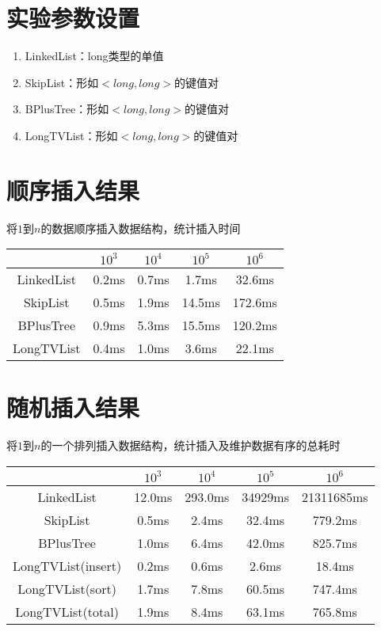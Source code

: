 \documentclass[UTF8]{article}
\begin{document}
\section{实验参数设置}
\begin{enumerate}
    \item LinkedList：long类型的单值
    \item SkipList：形如$<long, long>$的键值对
    \item BPlusTree：形如$<long, long>$的键值对
    \item LongTVList：形如$<long, long>$的键值对
\end{enumerate}

\section{顺序插入结果}
将$1$到$n$的数据顺序插入数据结构，统计插入时间

\begin{tabular}{|c|c|c|c|c|}

    \hline
     & $10^3$ & $10^4$ & $10^5$ & $10^6$ \\
    \hline
    LinkedList & 0.2ms & 0.7ms & 1.7ms & 32.6ms\\
    \hline
    SkipList & 0.5ms & 1.9ms & 14.5ms & 172.6ms\\
    \hline
    BPlusTree & 0.9ms & 5.3ms & 15.5ms & 120.2ms\\
    \hline
    LongTVList & 0.4ms & 1.0ms & 3.6ms & 22.1ms\\
    \hline

\end{tabular}

\section{随机插入结果}
将$1$到$n$的一个排列插入数据结构，统计插入及维护数据有序的总耗时

\begin{tabular}{|c|c|c|c|c|}

    \hline
     & $10^3$ & $10^4$ & $10^5$ & $10^6$ \\
    \hline
    LinkedList & 12.0ms & 293.0ms & 34929ms & 21311685ms\\
    \hline
    SkipList & 0.5ms & 2.4ms & 32.4ms & 779.2ms\\
    \hline
    BPlusTree & 1.0ms & 6.4ms & 42.0ms & 825.7ms\\
    \hline
    LongTVList(insert) & 0.2ms & 0.6ms & 2.6ms & 18.4ms\\
    \hline
    LongTVList(sort) & 1.7ms & 7.8ms & 60.5ms & 747.4ms\\
    \hline
    LongTVList(total) & 1.9ms & 8.4ms & 63.1ms & 765.8ms\\
    \hline

\end{tabular}
\end{document}
